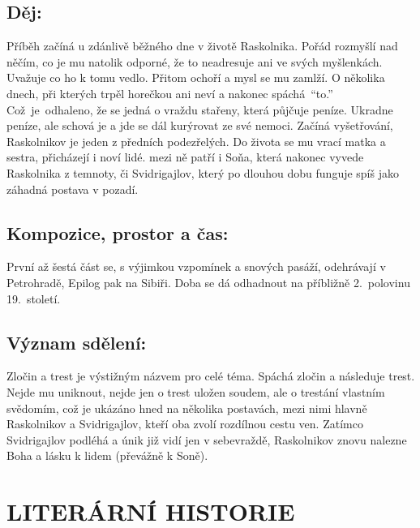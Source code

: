 \documentclass[A4paper]{extarticle} %
\begin{document}
\subsection*{Děj:}
\noindent 
Příběh začíná u zdánlivě běžného dne v životě Raskolnika. Pořád rozmyšlí nad něčím, co je mu natolik odporné, že to neadresuje ani ve svých myšlenkách. Uvažuje co ho k tomu vedlo. Přitom ochoří a mysl se mu zamlží. O několika dnech, při kterých trpěl horečkou ani neví a nakonec spáchá~\enquote{to.} Což~je~odhaleno, že se jedná o vraždu stařeny, která půjčuje peníze. Ukradne peníze, ale schová je a jde se dál kurýrovat ze své nemoci. Začíná vyšetřování, Raskolnikov je jeden z předních podezřelých. Do života se mu vrací matka a sestra, přicházejí i noví lidé. mezi ně patří i Soňa, která nakonec vyvede Raskolnika z temnoty, či Svidrigajlov, který po dlouhou dobu funguje spíš jako záhadná postava v pozadí.

\subsection*{Kompozice, prostor a čas:}
\noindent 
První až šestá část se, s výjimkou vzpomínek a snových pasáží, odehrávají v Petrohradě, Epilog pak na Sibiři. Doba se dá odhadnout na příbližně 2.~polovinu 19.~století.

\subsection*{Význam sdělení:}
\noindent 
Zločin a trest je výstižným názvem pro celé téma. Spáchá zločin a následuje trest. Nejde mu uniknout, nejde jen o trest uložen soudem, ale o trestání vlastním svědomím, což je ukázáno hned na několika postavách, mezi nimi hlavně Raskolnikov a Svidrigajlov, kteří oba zvolí rozdílnou cestu ven. Zatímco Svidrigajlov podléhá a únik již vidí jen v sebevraždě, Raskolnikov znovu nalezne Boha a lásku k lidem (převážně k Soně).

\section*{LITERÁRNÍ HISTORIE}


\end{document}
